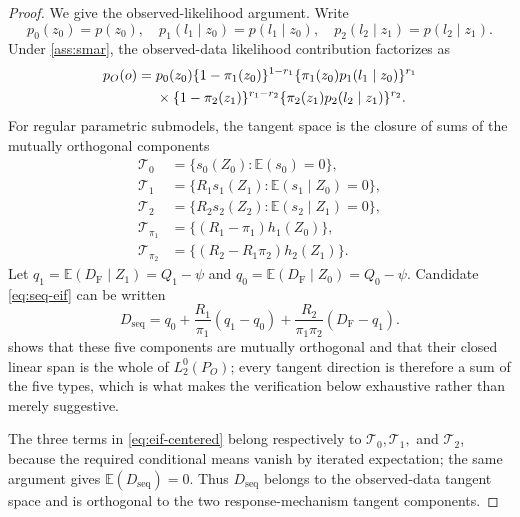 \documentclass[11pt]{article}
\theoremstyle{definition}
\newcommand{\E}{\mathbb{E}}
\newcommand{\1}{\mathbf{1}}
\newcommand{\seq}{\mathrm{seq}}
\newcommand{\F}{\mathrm{F}}
\begin{document}
\begin{proof}
We give the observed-likelihood argument. Write
\[
p_0(z_0)=p(z_0),\quad p_1(l_1\mid z_0)=p(l_1\mid z_0),\quad
p_2(l_2\mid z_1)=p(l_2\mid z_1).
\]
Under \cref{ass:smar}, the observed-data likelihood contribution factorizes as
\begin{align}
p_O(o)
={}&p_0(z_0)
\{1-\pi_1(z_0)\}^{1-r_1}
\{\pi_1(z_0)p_1(l_1\mid z_0)\}^{r_1}\notag\\
&\times\{1-\pi_2(z_1)\}^{r_1-r_2}
\{\pi_2(z_1)p_2(l_2\mid z_1)\}^{r_2}.
\label{eq:observed-likelihood}
\end{align}
For regular parametric submodels, the tangent space is the closure of sums of the mutually orthogonal components
\begin{align*}
\mathcal T_0&=\{s_0(Z_0):\E(s_0)=0\},\\
\mathcal T_1&=\{R_1s_1(Z_1):\E(s_1\mid Z_0)=0\},\\
\mathcal T_2&=\{R_2s_2(Z_2):\E(s_2\mid Z_1)=0\},\\
\mathcal T_{\pi_1}&=\{(R_1-\pi_1)h_1(Z_0)\},\\
\mathcal T_{\pi_2}&=\{(R_2-R_1\pi_2)h_2(Z_1)\}.
\end{align*}
Let $q_1=\E(D_{\F}\mid Z_1)=Q_1-\psi$ and
$q_0=\E(D_{\F}\mid Z_0)=Q_0-\psi$. Candidate \cref{eq:seq-eif} can be written
\begin{equation}\label{eq:eif-centered}
D_{\seq}=q_0+\frac{R_1}{\pi_1}(q_1-q_0)
+\frac{R_2}{\pi_1\pi_2}(D_{\F}-q_1).
\end{equation}
 shows that these five components are mutually orthogonal
and that their closed linear span is the whole of $L_2^0(P_O)$; every tangent
direction is therefore a sum of the five types, which is what makes the
verification below exhaustive rather than merely suggestive.

The three terms in \cref{eq:eif-centered} belong respectively to
$\mathcal T_0,\mathcal T_1,$ and $\mathcal T_2$, because the required conditional
means vanish by iterated expectation; the same argument gives
$\E(D_{\seq})=0$. Thus $D_{\seq}$ belongs to the observed-data tangent space and is
orthogonal to the two response-mechanism tangent components.


\end{proof}
\end{document}
